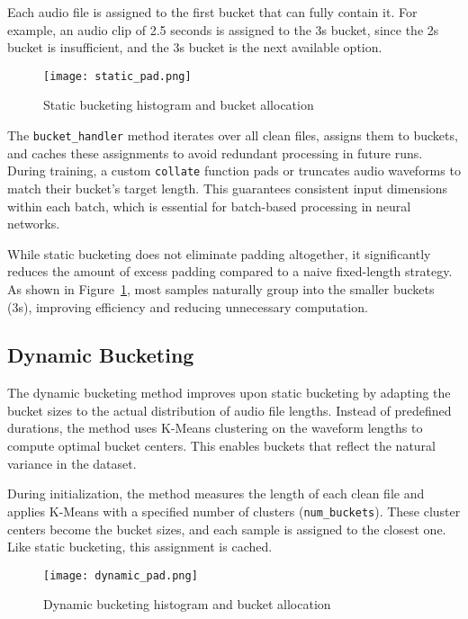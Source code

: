 Each audio file is assigned to the first bucket that can fully contain it. For example, an audio clip of 2.5 seconds is assigned to the 3s bucket, since the 2s bucket is insufficient, and the 3s bucket is the next available option.

\begin{figure}[H]
    \centering
    \texttt{[image: static\_pad.png]}
    \caption{Static bucketing histogram and bucket allocation}
    \label{fig:static_pad}
\end{figure}

The \texttt{bucket\_handler} method iterates over all clean files, assigns them to buckets, and caches these assignments to avoid redundant processing in future runs. During training, a custom \texttt{collate} function pads or truncates audio waveforms to match their bucket’s target length. This guarantees consistent input dimensions within each batch, which is essential for batch-based processing in neural networks.

While static bucketing does not eliminate padding altogether, it significantly reduces the amount of excess padding compared to a naive fixed-length strategy. As shown in Figure~\ref{fig:static_pad}, most samples naturally group into the smaller buckets (3s), improving efficiency and reducing unnecessary computation.

\subsection{Dynamic Bucketing}
\label{subsec:dynamic_dataset}

The dynamic bucketing method improves upon static bucketing by adapting the bucket sizes to the actual distribution of audio file lengths. Instead of predefined durations, the method uses K-Means clustering on the waveform lengths to compute optimal bucket centers. This enables buckets that reflect the natural variance in the dataset.

During initialization, the method measures the length of each clean file and applies K-Means with a specified number of clusters (\texttt{num\_buckets}). These cluster centers become the bucket sizes, and each sample is assigned to the closest one. Like static bucketing, this assignment is cached.

\begin{figure}[H]
    \centering
    \texttt{[image: dynamic\_pad.png]}
    \caption{Dynamic bucketing histogram and bucket allocation}
    \label{fig:dynamic_pad}
\end{figure}

